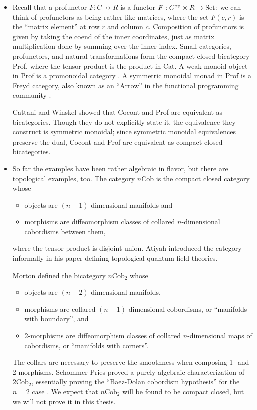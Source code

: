\documentclass[12pt,twoside,openright]{report}
\newcommand{\Set}{\mathrm{Set}}
\newcommand{\op}{{\rm op}}
\newcommand{\nCob}{n\mbox{Cob}}
\begin{document}
\begin{itemize}
    \item Recall that a profunctor $F:C \not\to R$ is a functor $F:C^
{\op} \times R \to \Set$; we can think of profunctors as being rather like matrices, where the set $F(c,r)$ is the ``matrix element'' at row
$r$ and column $c$.  Composition of profunctors is given by taking the coend of the inner coordinates, just as matrix multiplication done by summing over the inner index.  Small categories, profunctors, and natural transformations form the compact closed bicategory Prof, where the tensor product is the product in Cat.  A weak monoid object in Prof is a promonoidal category \cite{Day, Houston}. A symmetric monoidal monad in Prof is a Freyd category, also known as an ``Arrow'' in the functional programming community \cite{Asada, JHH}.

    Cattani and Winskel \cite{CW04} showed that Cocont and Prof are equivalent as bicategories.  Though they do not explicitly state it, the equivalence they construct is symmetric monoidal; since symmetric monoidal equivalences preserve the dual, Cocont and Prof are equivalent as compact closed bicategories.
  \item  So far the examples have been rather algebraic in flavor, but there are topological examples, too.  The category $\nCob$ is the compact closed category whose
    \begin{itemize}
      \item objects are $(n-1)$-dimensional manifolds and
      \item morphisms are diffeomorphism classes of collared
      $n$-dimensional cobordisms between them,
    \end{itemize}
    where the tensor product is disjoint union.  Atiyah \cite
{AtiyahTQFT} introduced the category informally in his paper defining topological quantum field theories.

    Morton \cite{Morton} defined the bicategory $\nCob_2$ whose
    \begin{itemize}
      \item objects are $(n-2)$-dimensional manifolds,
      \item morphisms are collared $(n-1)$-dimensional cobordisms, 
      or ``manifolds with boundary'', and
      \item 2-morphisms are diffeomorphism classes of collared 
      $n$-dimensional maps of cobordisms, or ``manifolds with corners''.
    \end{itemize}
    The collars are necessary to preserve the smoothness when composing 1- and 2-morphisms.  Schommer-Pries proved a purely algebraic characterization of $2\mbox{Cob}_2$, essentially proving the
``Baez-Dolan cobordism hypothesis'' for the $n=2$ case \cite{HDATQFT}. We expect that $\nCob_2$ will be found to be compact closed, but we will not prove it in this thesis.


\end{itemize}
\end{document}
